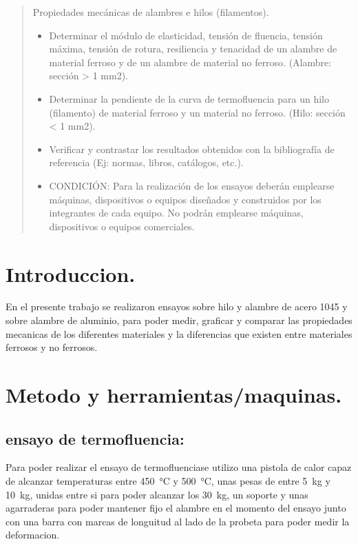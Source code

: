 \documentclass[12pt,a4paper]{article}
\begin{document}

\newpage
\tableofcontents

\begin{abstract}
    Propiedades mecánicas de alambres e hilos (filamentos).
    \begin{itemize}
        \item Determinar el módulo de elasticidad, tensión de fluencia, tensión máxima, tensión de rotura, resiliencia y tenacidad de un alambre de material ferroso y de un alambre de material no ferroso. (Alambre: sección > 1 mm2).
        \item Determinar la pendiente de la curva de termofluencia para un hilo (filamento) de material ferroso y un material no ferroso. (Hilo: sección < 1 mm2).
        \item Verificar y contrastar los resultados obtenidos con la bibliografía de referencia (Ej: normas, libros, catálogos, etc.).
        \item CONDICIÓN: Para la realización de los ensayos deberán emplearse máquinas, dispositivos o equipos diseñados y construidos por los integrantes de cada equipo. No podrán emplearse máquinas, dispositivos o equipos comerciales.
    \end{itemize}
\end{abstract}

\section{Introduccion.}

En el presente trabajo se realizaron ensayos sobre hilo y alambre de acero 1045 y sobre alambre de aluminio, para poder medir, graficar y comparar las propiedades mecanicas de los diferentes materiales y la diferencias que existen entre materiales ferrosos y no ferrosos.


\section{Metodo y herramientas/maquinas.}

\subsection{ensayo de termofluencia:}
Para poder realizar el ensayo de termofluenciase utilizo una pistola de calor capaz de alcanzar temperaturas entre \SI{450}{\celsius} y \SI{500}{\celsius}, unas pesas de entre \SI{5}{\kilogram} y \SI{10}{\kilogram}, unidas entre si para poder alcanzar los \SI{30}{\kilogram}, un soporte y unas agarraderas para poder mantener fijo el alambre en el momento del ensayo junto con una barra con marcas de longuitud al lado de la probeta para poder medir la deformacion.
\end{document}
